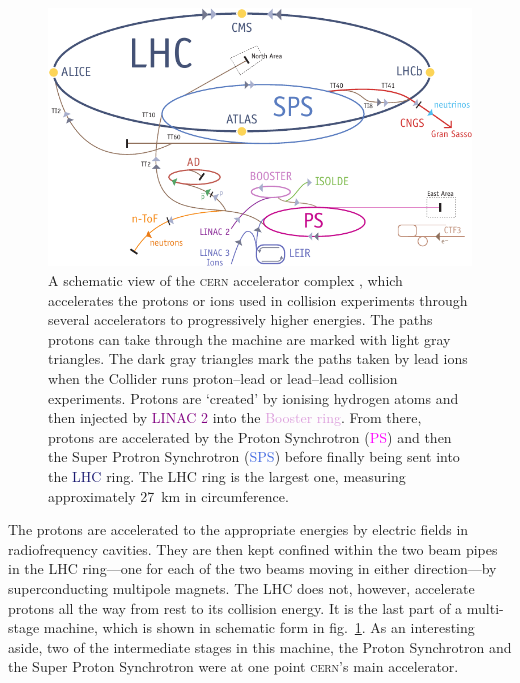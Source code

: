 \begin{figure}[htp]
\begin{center}
\includegraphics[width=.8\textwidth]{Cernrings}
\end{center}
\begin{minipage}[b]{\textwidth}
\caption{A schematic view of the \textsc{cern} accelerator complex \cite{cernbro}, which accelerates the protons or ions used in collision experiments through several accelerators to progressively higher energies. The paths protons can take through the machine are marked with light gray triangles. The dark gray triangles mark the paths taken by lead ions when the Collider runs proton--lead or lead--lead collision experiments. Protons are `created' by ionising hydrogen atoms and then injected by \textcolor{Purple}{LINAC 2} into the \textcolor{Plum}{Booster ring}. From there, protons are accelerated by the Proton Synchrotron (\textcolor{Magenta}{PS}) and then the Super Protron Synchrotron (\textcolor{RoyalBlue}{SPS}) before finally being sent into the \textcolor{MidnightBlue}{LHC} ring. The LHC ring is the largest one, measuring approximately 27~km in circumference.}
\label{cernrings}
\end{minipage}
\end{figure}

The protons are accelerated to the appropriate energies by electric fields in radiofrequency cavities. They are then kept confined within the two beam pipes in the LHC ring---one for each of the two beams moving in either direction---by superconducting multipole magnets. The LHC does not, however, accelerate protons all the way from rest to its collision energy. It is the last part of a multi-stage machine, which is shown in schematic form in fig.~\ref{cernrings}. As an interesting aside, two of the intermediate stages in this machine, the Proton Synchrotron and the Super Proton Synchrotron were at one point \textsc{cern}'s main accelerator.


